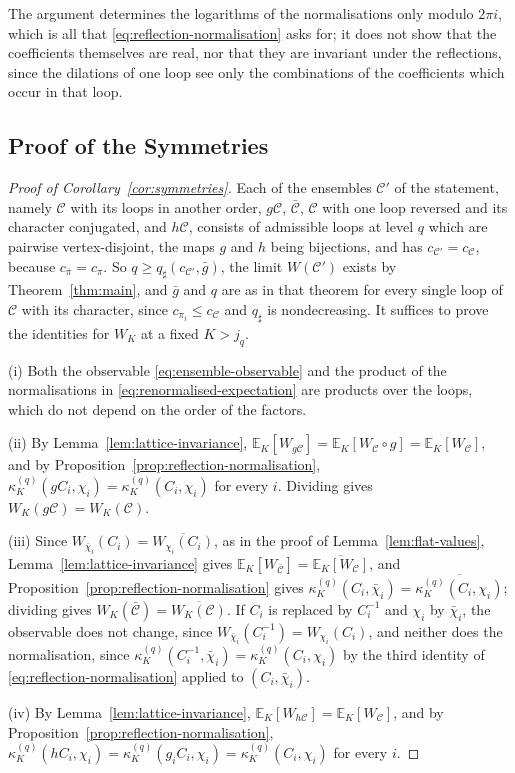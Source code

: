 \documentclass[11pt]{preprint}
\numberwithin{equation}{section}
\theoremstyle{definition}
\theoremstyle{remark}
\theoremstyle{plain}
\begin{document}
The argument determines the logarithms of the normalisations only modulo $2\pi i$, which is all that \eqref{eq:reflection-normalisation} asks for; it does not show that the coefficients themselves are real, nor that they are invariant under the reflections, since the dilations of one loop see only the combinations of the coefficients which occur in that loop.

\subsection{Proof of the Symmetries}\label{sec:symmetries-proof}

\begin{proof}[Proof of Corollary~\ref{cor:symmetries}]
Each of the ensembles $\mathcal C'$ of the statement, namely $\mathcal C$ with its loops in another order, $g\mathcal C$, $\bar{\mathcal C}$, $\mathcal C$ with one loop reversed and its character conjugated, and $h\mathcal C$, consists of admissible loops at level $q$ which are pairwise vertex-disjoint, the maps $g$ and $h$ being bijections, and has $c_{\mathcal C'} = c_{\mathcal C}$, because $c_{\bar\pi} = c_\pi$. So $q \geq q_\sharp(c_{\mathcal C'}, \bar g)$, the limit $W(\mathcal C')$ exists by Theorem~\ref{thm:main}, and $\bar g$ and $q$ are as in that theorem for every single loop of $\mathcal C$ with its character, since $c_{\pi_i} \leq c_{\mathcal C}$ and $q_\sharp$ is nondecreasing. It suffices to prove the identities for $W_K$ at a fixed $K > j_q$.

(i) Both the observable \eqref{eq:ensemble-observable} and the product of the normalisations in \eqref{eq:renormalised-expectation} are products over the loops, which do not depend on the order of the factors.

(ii) By Lemma~\ref{lem:lattice-invariance}, $\mathbb E_K[W_{g\mathcal C}] = \mathbb E_K[W_{\mathcal C} \circ g] = \mathbb E_K[W_{\mathcal C}]$, and by Proposition~\ref{prop:reflection-normalisation}, $\kappa^{(q)}_K(gC_i, \chi_i) = \kappa^{(q)}_K(C_i, \chi_i)$ for every $i$. Dividing gives $W_K(g\mathcal C) = W_K(\mathcal C)$.

(iii) Since $W_{\bar\chi_i}(C_i) = \overline{W_{\chi_i}(C_i)}$, as in the proof of Lemma~\ref{lem:flat-values}, Lemma~\ref{lem:lattice-invariance} gives $\mathbb E_K[W_{\bar{\mathcal C}}] = \overline{\mathbb E_K[W_{\mathcal C}]}$, and Proposition~\ref{prop:reflection-normalisation} gives $\kappa^{(q)}_K(C_i, \bar\chi_i) = \overline{\kappa^{(q)}_K(C_i, \chi_i)}$; dividing gives $W_K(\bar{\mathcal C}) = \overline{W_K(\mathcal C)}$. If $C_i$ is replaced by $C_i^{-1}$ and $\chi_i$ by $\bar\chi_i$, the observable does not change, since $W_{\bar\chi_i}(C_i^{-1}) = W_{\chi_i}(C_i)$, and neither does the normalisation, since $\kappa^{(q)}_K(C_i^{-1}, \bar\chi_i) = \kappa^{(q)}_K(C_i, \chi_i)$ by the third identity of \eqref{eq:reflection-normalisation} applied to $(C_i, \bar\chi_i)$.

(iv) By Lemma~\ref{lem:lattice-invariance}, $\mathbb E_K[W_{h\mathcal C}] = \mathbb E_K[W_{\mathcal C}]$, and by Proposition~\ref{prop:reflection-normalisation}, $\kappa^{(q)}_K(hC_i, \chi_i) = \kappa^{(q)}_K(g_iC_i, \chi_i) = \kappa^{(q)}_K(C_i, \chi_i)$ for every $i$.
\end{proof}
\end{document}
